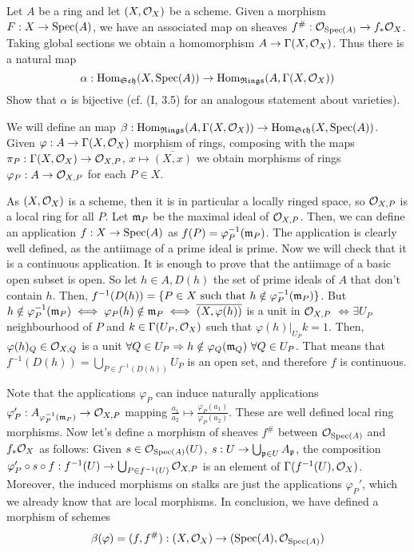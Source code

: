 \begin{ex}
	Let $A$ be a ring and let $(X, \mathcal{O}_X)$ be a scheme. Given a morphism $F: X \to \mathrm{Spec}(A)$, we have an associated map on sheaves $f^{\#}: \mathcal{O}_{\mathrm{Spec}(A)} \to f_* \mathcal{O}_X$. Taking global sections we obtain a homomorphism $A \to \Gamma(X,\mathcal{O}_X)$. Thus there is a natural map
	\[
		\alpha: \mathrm{Hom}_{\mathfrak{Sch}}(X, \mathrm{Spec}(A)) \to \mathrm{Hom}_{\mathfrak{Rings}}(A,\Gamma(X, \mathcal{O}_X))
	\]
	Show that $\alpha$ is bijective (cf. (I, 3.5) for an analogous statement about varieties).
\end{ex}

\begin{sol}
	We will define an map $\beta: \mathrm{Hom}_{\mathfrak{Rings}}(A,\Gamma(X, \mathcal{O}_X)) \to \mathrm{Hom}_{\mathfrak{Sch}}(X, \mathrm{Spec}(A))$. Given $\varphi: A \to \Gamma(X, \mathcal{O}_X)$ morphism of rings, composing with the maps $\pi_P: \Gamma(X,\mathcal{O}_X) \to \mathcal{O}_{X,P}$, $x \mapsto \overline{(X,x)}$ we obtain morphisms of rings $\varphi_P: A \to \mathcal{O}_{X,P}$ for each $P \in X$.

	As $(X, \mathcal{O}_X)$ is a scheme, then it is in particular a locally ringed space, so $\mathcal{O}_{X,P}$ is a local ring for all $P$. Let $\mathfrak{m}_P$ be the maximal ideal of $\mathcal{O}_{X,P}$. Then, we can define an application $f: X \to \mathrm{Spec}(A)$ as $f(P) = \varphi_P^{-1}(\mathfrak{m}_P)$. The application is clearly well defined, as the antiimage of a prime ideal is prime. Now we will check that it is a continuous application. It is enough to prove that the antiimage of a basic open subset is open. So let $h \in A, D(h)$ the set of prime ideals of $A$ that don't contain $h$. Then, $f^{-1}(D(h)) = \{P \in X \text{ such that } h \notin \varphi_P^{-1}(\mathfrak{m}_P)\}$. But $h \notin \varphi_P^{-1}(\mathfrak{m}_P) \iff \varphi_P(h) \notin \mathfrak{m}_P \iff \overline{(X,\varphi(h))}$ is a unit in $\mathcal{O}_{X,P}$ $\iff \exists U_P$ neighbourhood of $P$ and $k \in \Gamma(U_P, \mathcal{O}_X)$ such that $\varphi(h)|_{U_P} k = 1$. Then, $\varphi(h)_Q \in \mathcal{O}_{X,Q}$ is a unit $\forall Q \in U_P \Rightarrow h \notin \varphi_Q(\mathfrak{m}_Q) \, \, \forall Q \in U_P$. That means that $f^{-1}(D(h)) = \bigcup_{P \in f^{-1}(D(h))} U_P$ is an open set, and therefore $f$ is continuous.

	Note that the applications $\varphi_P$ can induce naturally applications $\varphi'_P: A_{\varphi^{-1}_P(\mathfrak{m}_P)} \to \mathcal{O}_{X,P}$ mapping $\frac{a_1}{a_2} \mapsto \frac{\varphi_P(a_1)}{\varphi_P(a_2)}$. These are well defined local ring morphisms. Now let's define a morphism of sheaves $f^{\#}$ between $\mathcal{O}_{\mathrm{Spec}(A)}$ and $f_*\mathcal{O}_X$ as follows: Given $s \in \mathcal{O}_{\mathrm{Spec}(A)}(U)$, $s: U \to \bigcup_{\mathfrak{p} \in U} A_{\mathfrak{p}}$, the composition $\varphi_P' \circ s \circ f: f^{-1}(U) \to \bigcup_{P \in f^{-1}(U)} \mathcal{O}_{X,P}$ is an element of $\Gamma(f^{-1}(U),\mathcal{O}_X)$. Moreover, the induced morphisms on stalks are just the applications $\varphi_P'$, which we already know that are local morphisms. In conclusion, we have defined a morphism of schemes 
	\[
		\beta(\varphi) = (f, f^{\#}): (X,\mathcal{O}_X) \to (\mathrm{Spec}(A), \mathcal{O}_{\mathrm{Spec}(A)})
	\]


\end{sol}

